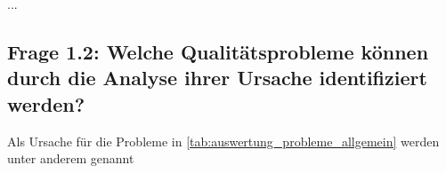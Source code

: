 
...

\subsection{Frage 1.2: Welche Qualitätsprobleme können durch die Analyse ihrer Ursache identifiziert werden?}

Als Ursache für die Probleme in \ref{tab:auswertung_probleme_allgemein} werden unter anderem genannt

